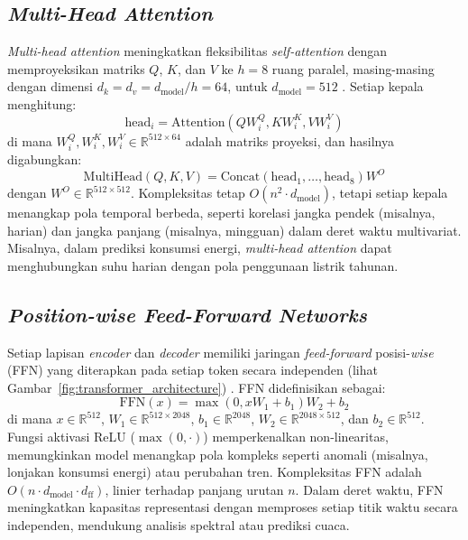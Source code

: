 \subsection{\textit{Multi-Head Attention}}
\label{sec:multi_head_attention}

\textit{Multi-head attention} meningkatkan fleksibilitas \textit{self-attention} dengan memproyeksikan matriks \( Q \), \( K \), dan \( V \) ke \( h=8 \) ruang paralel, masing-masing dengan dimensi \( d_k = d_v = d_{\text{model}} / h = 64 \), untuk \( d_{\text{model}} = 512 \) \citep{Vaswani2017}. Setiap kepala menghitung:
\begin{equation}
\text{head}_i = \text{Attention}(Q W_i^Q, K W_i^K, V W_i^V)
\end{equation}
di mana \( W_i^Q, W_i^K, W_i^V \in \mathbb{R}^{512 \times 64} \) adalah matriks proyeksi, dan hasilnya digabungkan:
\begin{equation}
\text{MultiHead}(Q, K, V) = \text{Concat}(\text{head}_1, \ldots, \text{head}_8) W^O
\end{equation}
dengan \( W^O \in \mathbb{R}^{512 \times 512} \). Kompleksitas tetap \( O(n^2 \cdot d_{\text{model}}) \), tetapi setiap kepala menangkap pola temporal berbeda, seperti korelasi jangka pendek (misalnya, harian) dan jangka panjang (misalnya, mingguan) dalam deret waktu multivariat. Misalnya, dalam prediksi konsumsi energi, \textit{multi-head attention} dapat menghubungkan suhu harian dengan pola penggunaan listrik tahunan.

\subsection{\textit{Position-wise Feed-Forward Networks}}
\label{sec:ffn}

Setiap lapisan \textit{encoder} dan \textit{decoder} memiliki jaringan \textit{feed-forward} posisi-\textit{wise} (FFN) yang diterapkan pada setiap token secara independen (lihat Gambar~\ref{fig:transformer_architecture}) \citep{Vaswani2017}. FFN didefinisikan sebagai:
\begin{equation}
\text{FFN}(x) = \max(0, x W_1 + b_1) W_2 + b_2
\end{equation}
di mana \( x \in \mathbb{R}^{512} \), \( W_1 \in \mathbb{R}^{512 \times 2048} \), \( b_1 \in \mathbb{R}^{2048} \), \( W_2 \in \mathbb{R}^{2048 \times 512} \), dan \( b_2 \in \mathbb{R}^{512} \). Fungsi aktivasi ReLU (\(\max(0, \cdot)\)) memperkenalkan non-linearitas, memungkinkan model menangkap pola kompleks seperti anomali (misalnya, lonjakan konsumsi energi) atau perubahan tren. Kompleksitas FFN adalah \( O(n \cdot d_{\text{model}} \cdot d_{\text{ff}}) \), linier terhadap panjang urutan \( n \). Dalam deret waktu, FFN meningkatkan kapasitas representasi dengan memproses setiap titik waktu secara independen, mendukung analisis spektral atau prediksi cuaca.

